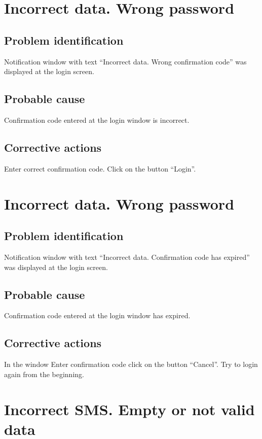 \section{Incorrect data. Wrong password}

\subsection{Problem identification}
Notification window with text ``Incorrect data. Wrong confirmation code''
was displayed at the login screen.

\subsection{Probable cause}
Confirmation code entered at the login window is incorrect.

\subsection{Corrective actions}
Enter correct confirmation code. Click on the button ``Login''.


\section{Incorrect data. Wrong password}

\subsection{Problem identification}
Notification window with text ``Incorrect data. Confirmation code has
expired'' was displayed at the login screen.

\subsection{Probable cause}
Confirmation code entered at the login window has expired.

\subsection{Corrective actions}
In the window Enter confirmation code click on the button ``Cancel''. 
Try to login again from the beginning.

\section{Incorrect SMS. Empty or not valid data}


